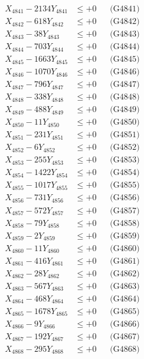 \documentclass[a4paper,10pt]{article}
\begin{document}
{\begin{align}
\allowbreak
X_{4841} - 2134Y_{4841} &\leq +0 && \text{(G4841)} \\
X_{4842} - 618Y_{4842} &\leq +0 && \text{(G4842)} \\
X_{4843} - 38Y_{4843} &\leq +0 && \text{(G4843)} \\
X_{4844} - 703Y_{4844} &\leq +0 && \text{(G4844)} \\
X_{4845} - 1663Y_{4845} &\leq +0 && \text{(G4845)} \\
X_{4846} - 1070Y_{4846} &\leq +0 && \text{(G4846)} \\
X_{4847} - 796Y_{4847} &\leq +0 && \text{(G4847)} \\
X_{4848} - 338Y_{4848} &\leq +0 && \text{(G4848)} \\
X_{4849} - 488Y_{4849} &\leq +0 && \text{(G4849)} \\
X_{4850} - 11Y_{4850} &\leq +0 && \text{(G4850)} \\
\allowbreak
X_{4851} - 231Y_{4851} &\leq +0 && \text{(G4851)} \\
X_{4852} - 6Y_{4852} &\leq +0 && \text{(G4852)} \\
X_{4853} - 255Y_{4853} &\leq +0 && \text{(G4853)} \\
X_{4854} - 1422Y_{4854} &\leq +0 && \text{(G4854)} \\
X_{4855} - 1017Y_{4855} &\leq +0 && \text{(G4855)} \\
X_{4856} - 731Y_{4856} &\leq +0 && \text{(G4856)} \\
X_{4857} - 572Y_{4857} &\leq +0 && \text{(G4857)} \\
X_{4858} - 79Y_{4858} &\leq +0 && \text{(G4858)} \\
X_{4859} - 2Y_{4859} &\leq +0 && \text{(G4859)} \\
X_{4860} - 11Y_{4860} &\leq +0 && \text{(G4860)} \\
\allowbreak
X_{4861} - 416Y_{4861} &\leq +0 && \text{(G4861)} \\
X_{4862} - 28Y_{4862} &\leq +0 && \text{(G4862)} \\
X_{4863} - 567Y_{4863} &\leq +0 && \text{(G4863)} \\
X_{4864} - 468Y_{4864} &\leq +0 && \text{(G4864)} \\
X_{4865} - 1678Y_{4865} &\leq +0 && \text{(G4865)} \\
X_{4866} - 9Y_{4866} &\leq +0 && \text{(G4866)} \\
X_{4867} - 192Y_{4867} &\leq +0 && \text{(G4867)} \\
X_{4868} - 295Y_{4868} &\leq +0 && \text{(G4868)} \\

\end{align}}
\end{document}

